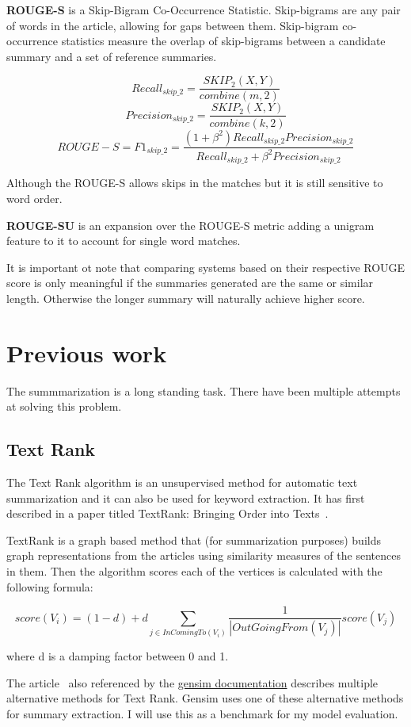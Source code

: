 \textbf{ROUGE-S} is a Skip-Bigram Co-Occurrence Statistic. Skip-bigrams are any pair of words in the article, allowing for gaps between them. Skip-bigram co-occurrence statistics measure the overlap of skip-bigrams between a candidate summary and a set of reference summaries.

\[Recall_{skip\_2} = \frac{SKIP_2(X, Y)}{combine(m, 2)}\]
\[Precision_{skip\_2} = \frac{SKIP_2(X, Y)}{combine(k, 2)}\]
\[ROUGE-S = F1_{skip\_2} = \frac{(1 + \beta^2)Recall_{skip\_2}Precision_{skip\_2}}{Recall_{skip\_2} + \beta^2Precision_{skip\_2}}\]

Although the ROUGE-S allows skips in the matches but it is still sensitive to word order.

\textbf{ROUGE-SU} is an expansion over the ROUGE-S metric adding a unigram feature to it to account for single word matches.

It is important ot note that comparing systems based on their respective ROUGE score is only meaningful if the summaries generated are the same or similar length. Otherwise the longer summary will naturally achieve higher score.

\section{Previous work}
The summmarization is a long standing task. There have been multiple attempts at solving this problem.

\subsection{Text Rank}

The Text Rank algorithm is an unsupervised method for automatic text summarization and it can also be used for keyword extraction. It has first described in a paper titled TextRank: Bringing Order into Texts~\cite{TextRank:2004}.

TextRank is a graph based method that (for summarization purposes) builds graph representations from the articles using similarity measures of the sentences in them. Then the algorithm scores each of the vertices is calculated with the following formula:

\[score(V_i) = (1 - d) + d \sum_{j \in InComingTo(V_i)} \frac{1}{|OutGoingFrom(V_j)|} score(V_j)\]

where d is a damping factor between 0 and 1.

The article~\cite{TextRank} also referenced by the \href{https://radimrehurek.com/gensim/summarization/summariser.html}{gensim documentation} describes multiple alternative methods for Text Rank. Gensim uses one of these alternative methods for summary extraction.
I will use this as a benchmark for my model evaluation.


